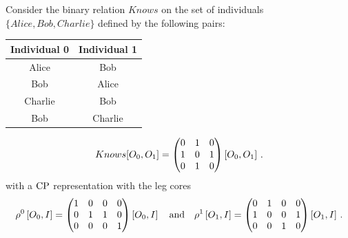 \begin{example}
    Consider the binary relation $Knows$ on the set of individuals $\{Alice,Bob,Charlie\}$ defined by the following pairs:
    \begin{center}

        \begin{tabular}{c|c}
            \textbf{Individual 0} & \textbf{Individual 1} \\
            \hline
            Alice                 & Bob                   \\
            Bob                   & Alice                 \\
            Charlie               & Bob                   \\
            Bob                   & Charlie
        \end{tabular}
    \end{center}

    \begin{align*}
        Knows[O_{0},O_{1}] =
        \begin{pmatrix} 
            0 & 1 & 0 \\
            1 & 0 & 1 \\
            0 & 1 & 0
         \end{pmatrix}\left[O_{0},O_{1}\right] \, .
    \end{align*}
    with a $\mathrm{CP}$ representation with the leg cores
    \begin{align*}
        \rho^{0}\left[O_{0},I\right]
        = \begin{pmatrix} 
            1 & 0 & 0 & 0 \\
            0 & 1 & 1 & 0 \\
            0 & 0 & 0 & 1
         \end{pmatrix}\left[O_{0},I\right]
        \quad \text{and} \quad
        \rho^{1}\left[O_{1},I\right]
        = \begin{pmatrix} 
            0 & 1 & 0 & 0 \\
            1 & 0 & 0 & 1 \\
            0 & 0 & 1 & 0
         \end{pmatrix}\left[O_{1},I\right] \, .
    \end{align*}


\end{example}
